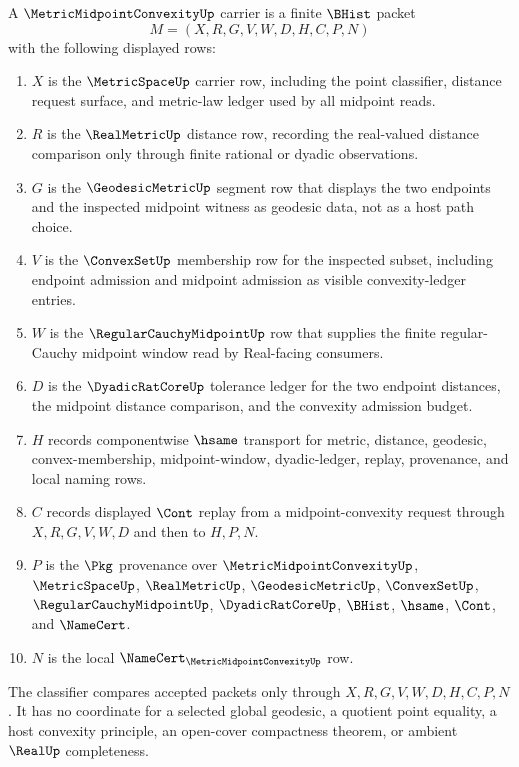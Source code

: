 \begin{definition}
\label{def:metric-midpoint-convexity-carrier}
A $\MetricMidpointConvexityUp$ carrier is a finite $\BHist$ packet
$$
M=(X,R,G,V,W,D,H,C,P,N)
$$
with the following displayed rows:
\begin{enumerate}
\item $X$ is the $\MetricSpaceUp$ carrier row, including the point classifier, distance request surface, and metric-law ledger used by all midpoint reads.
\item $R$ is the $\RealMetricUp$ distance row, recording the real-valued distance comparison only through finite rational or dyadic observations.
\item $G$ is the $\GeodesicMetricUp$ segment row that displays the two endpoints and the inspected midpoint witness as geodesic data, not as a host path choice.
\item $V$ is the $\ConvexSetUp$ membership row for the inspected subset, including endpoint admission and midpoint admission as visible convexity-ledger entries.
\item $W$ is the $\RegularCauchyMidpointUp$ row that supplies the finite regular-Cauchy midpoint window read by Real-facing consumers.
\item $D$ is the $\DyadicRatCoreUp$ tolerance ledger for the two endpoint distances, the midpoint distance comparison, and the convexity admission budget.
\item $H$ records componentwise $\hsame$ transport for metric, distance, geodesic, convex-membership, midpoint-window, dyadic-ledger, replay, provenance, and local naming rows.
\item $C$ records displayed $\Cont$ replay from a midpoint-convexity request through $X,R,G,V,W,D$ and then to $H,P,N$.
\item $P$ is the $\Pkg$ provenance over $\MetricMidpointConvexityUp$, $\MetricSpaceUp$, $\RealMetricUp$, $\GeodesicMetricUp$, $\ConvexSetUp$, $\RegularCauchyMidpointUp$, $\DyadicRatCoreUp$, $\BHist$, $\hsame$, $\Cont$, and $\NameCert$.
\item $N$ is the local $\NameCert_{\MetricMidpointConvexityUp}$ row.
\end{enumerate}
The classifier compares accepted packets only through $X,R,G,V,W,D,H,C,P,N$. It has no coordinate for a selected global geodesic, a quotient point equality, a host convexity principle, an open-cover compactness theorem, or ambient $\RealUp$ completeness.
\end{definition}

